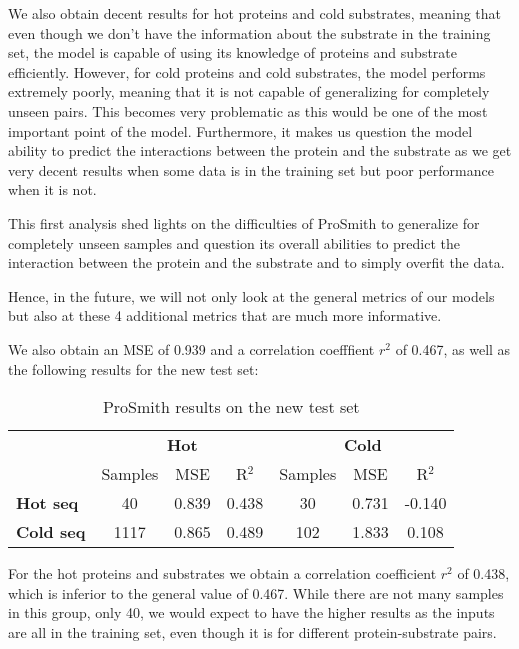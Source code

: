 We also obtain decent results for hot proteins and cold substrates, meaning that even though we don't have the information about the substrate in the training set, the model is capable of using its knowledge of proteins and substrate efficiently. However, for cold proteins and cold substrates, the model performs extremely poorly, meaning that it is not capable of generalizing for completely unseen pairs. This becomes very problematic as this would be one of the most important point of the model. Furthermore, it makes us question the model ability to predict the interactions between the protein and the substrate as we get very decent results when some data is in the training set but poor performance when it is not.

This first analysis shed lights on the difficulties of ProSmith to generalize for completely unseen samples and question its overall abilities to predict the interaction between the protein and the substrate and to simply overfit the data.

Hence, in the future, we will not only look at the general metrics of our models but also at these 4
additional metrics that are much more informative.

We also obtain an MSE of 0.939 and a correlation coefffient $r^2$ of 0.467, as well as the following results for the new test set:

\begin{table}[ht]
  \centering
  \begin{tabular}{lcccccc}
  \hline
   & \multicolumn{3}{c}{\textbf{Hot}} & \multicolumn{3}{c}{\textbf{Cold}} \\
   & Samples & MSE & R\(^2\) & Samples & MSE & R\(^2\) \\ \hline
  \textbf{Hot seq}  & 40 & 0.839 & 0.438 & 30 & 0.731 & -0.140 \\
  \textbf{Cold seq} & 1117 & 0.865 & 0.489 & 102 & 1.833 & 0.108 \\ \hline
  \end{tabular}
  \caption{ProSmith results on the new test set}
  \label{tab:summary_performance}
\end{table}

For the hot proteins and substrates we obtain a correlation coefficient $r^2$ of 0.438, which is inferior to the general value of 0.467. While there are not many samples in this group, only 40, we would expect to have the higher results as the inputs are all in the training set, even though it is for different protein-substrate pairs. 

